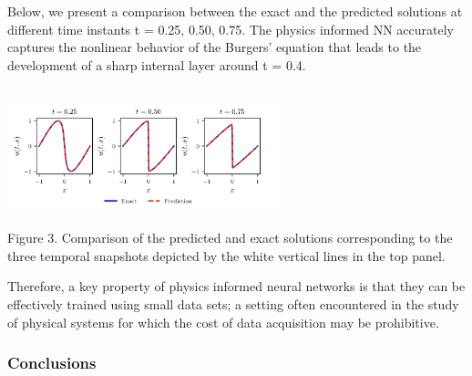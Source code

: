 \documentclass{beamer}
\begin{document}
\begin{frame}

Below, we present a comparison between the exact and the predicted solutions at different time instants t = 0.25, 0.50, 0.75. The physics informed NN accurately captures the nonlinear behavior of the Burgers' equation that leads to the development of a sharp internal layer around t = 0.4.
    
\begin{center}
\includegraphics[width = 8cm , height = 4cm]{02-presentation-v1/images/exact_pred_burgers.png}
\\
\caption{Figure 3. Comparison of the predicted and exact solutions corresponding to the three temporal snapshots depicted by the white vertical lines in the top panel.}
\end{center}

\end{frame}

\begin{frame}

Therefore, a key property of physics informed neural networks is that they can be effectively trained using small data sets; a setting often encountered in the study of physical systems for which the cost of data acquisition may be prohibitive.
    
\end{frame}


\begin{frame}
    \frametitle{Conclusions}

\end{frame}




\end{document}
